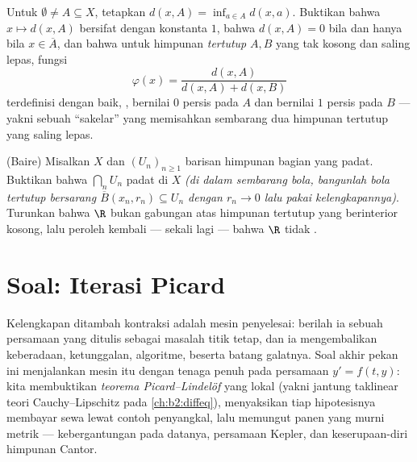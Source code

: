 \begin{exercise}[$\star\star$]\label{exo:b2:metric:11}
Untuk $\emptyset \neq A \subseteq X$, tetapkan $d(x, A) = \inf_{a \in A}
d(x, a)$. Buktikan bahwa $x \mapsto d(x, A)$ bersifat  dengan
konstanta $1$, bahwa $d(x, A) = 0$ bila dan hanya bila $x \in \overline
A$, dan bahwa untuk himpunan \emph{tertutup} $A, B$ yang tak kosong dan
saling lepas, fungsi
\[
\varphi(x) = \frac{d(x, A)}{d(x, A) + d(x, B)}
\]
terdefinisi dengan baik, , bernilai $0$ persis pada $A$ dan
bernilai $1$ persis pada $B$ --- yakni sebuah ``sakelar''  yang
memisahkan sembarang dua himpunan tertutup yang saling lepas.
\end{exercise}

\begin{exercise}[$\star\star\star$]\label{exo:b2:metric:12}
(Baire) Misalkan $X$  dan $(U_n)_{n\geq1}$
barisan himpunan bagian  yang padat. Buktikan bahwa $\bigcap_n
U_n$ padat di $X$ \emph{(di dalam sembarang bola, bangunlah bola
tertutup bersarang $\overline B(x_n, r_n) \subseteq U_n$ dengan $r_n \to
0$ lalu pakai kelengkapannya)}. Turunkan bahwa $\R$ bukan gabungan
 atas himpunan tertutup yang berinterior kosong, lalu peroleh
kembali --- sekali lagi --- bahwa $\R$ tidak .
\end{exercise}

\section{Soal: Iterasi Picard}

Kelengkapan ditambah kontraksi adalah mesin penyelesai: berilah ia sebuah
persamaan yang ditulis sebagai masalah titik tetap, dan ia mengembalikan
keberadaan, ketunggalan, algoritme, beserta batang galatnya. Soal akhir
pekan ini menjalankan mesin itu dengan tenaga penuh pada persamaan $y' =
f(t, y)$: kita membuktikan \emph{teorema Picard--Lindelöf} yang lokal
(yakni jantung taklinear teori Cauchy--Lipschitz pada
\cref{ch:b2:diffeq}), menyaksikan tiap hipotesisnya membayar sewa lewat
contoh penyangkal, lalu memungut panen yang murni metrik ---
kebergantungan  pada datanya, persamaan Kepler, dan
keserupaan-diri himpunan Cantor.

